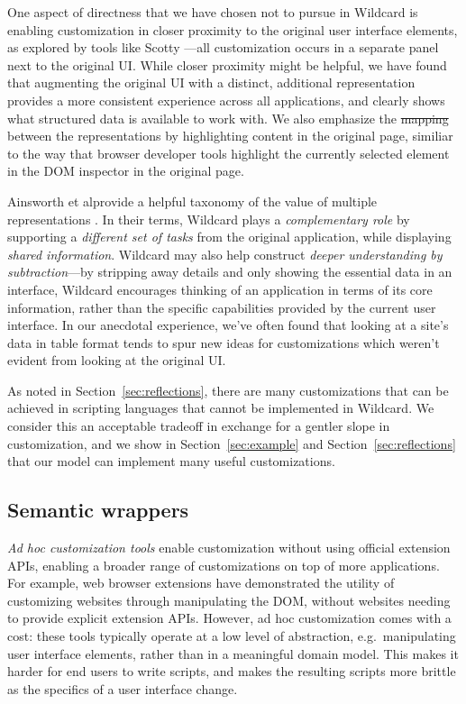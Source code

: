 \documentclass[sigplan,screen,10pt,anonymous,review]{acmart}
\providecommand{\DIFadd}[1]{{\protect\color{blue}\uwave{#1}}} %
\providecommand{\DIFdel}[1]{{\protect\color{red}\sout{#1}}}                      %
\providecommand{\DIFaddbegin}{} %
\providecommand{\DIFaddend}{} %
\providecommand{\DIFdelbegin}{} %
\providecommand{\DIFdelend}{} %
\begin{document}
One aspect of directness that we have chosen not to pursue in Wildcard
is enabling customization in closer proximity to the original user
interface elements, as explored by tools like Scotty
\citep{eagan2011}---all customization occurs in a separate panel next to
the original UI. While closer proximity might be helpful, we have found
that augmenting the original UI with a distinct, additional
representation provides a more consistent experience across all
applications, and clearly shows what structured data is available to
work with. We also emphasize the \DIFdelbegin \DIFdel{mapping }\DIFdelend \DIFaddbegin \DIFadd{map ping }\DIFaddend between the representations by
highlighting content in the original page, similiar to the way that
browser developer tools highlight the currently selected element in the
DOM inspector in the original page.

Ainsworth et al\DIFaddbegin \DIFadd{.~}\DIFaddend provide a helpful taxonomy of the value of multiple
representations \citep{ainsworth1999}. In their terms, Wildcard plays a
\emph{complementary role} by supporting a \emph{different set of tasks}
from the original application, while displaying \emph{shared
information}. Wildcard may also help construct \emph{deeper
understanding by subtraction}---by stripping away details and only
showing the essential data in an interface, Wildcard encourages thinking
of an application in terms of its core information, rather than the
specific capabilities provided by the current user interface. In our
anecdotal experience, we've often found that looking at a site's data in
table format tends to spur new ideas for customizations which weren't
evident from looking at the original UI.

As noted in Section~\ref{sec:reflections}, there are many customizations
that can be achieved in scripting languages that cannot be implemented
in Wildcard. We consider this an acceptable tradeoff in exchange for a
gentler slope in customization, and we show in Section~\ref{sec:example}
and Section~\ref{sec:reflections} that our model can implement many
useful customizations.

\hypertarget{semantic-wrappers}{%
\subsection{Semantic wrappers}\label{semantic-wrappers}}

\emph{Ad hoc customization tools} enable customization without using
official extension APIs, enabling a broader range of customizations on
top of more applications. For example, web browser extensions have
demonstrated the utility of customizing websites through manipulating
the DOM, without websites needing to provide explicit extension APIs.
However, ad hoc customization comes with a cost: these tools typically
operate at a low level of abstraction, e.g.~manipulating user interface
elements, rather than in a meaningful domain model. This makes it harder
for end users to write scripts, and makes the resulting scripts more
brittle as the specifics of a user interface change.
\end{document}
